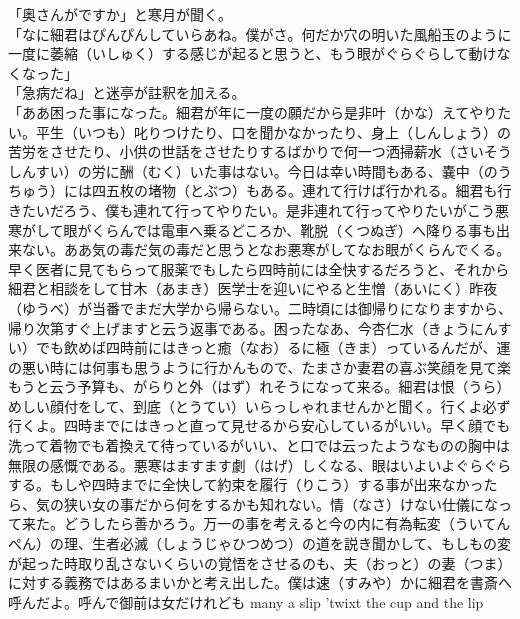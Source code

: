 \documentclass{book}
\begin{document}
「奥さんがですか」と寒月が聞く。\\
「なに細君はぴんぴんしていらあね。僕がさ。何だか穴の明いた風船玉のように一度に萎縮（いしゅく）する感じが起ると思うと、もう眼がぐらぐらして動けなくなった」\\
「急病だね」と迷亭が註釈を加える。\\
「ああ困った事になった。細君が年に一度の願だから是非叶（かな）えてやりたい。平生（いつも）叱りつけたり、口を聞かなかったり、身上（しんしょう）の苦労をさせたり、小供の世話をさせたりするばかりで何一つ洒掃薪水（さいそうしんすい）の労に酬（むく）いた事はない。今日は幸い時間もある、嚢中（のうちゅう）には四五枚の堵物（とぶつ）もある。連れて行けば行かれる。細君も行きたいだろう、僕も連れて行ってやりたい。是非連れて行ってやりたいがこう悪寒がして眼がくらんでは電車へ乗るどころか、靴脱（くつぬぎ）へ降りる事も出来ない。ああ気の毒だ気の毒だと思うとなお悪寒がしてなお眼がくらんでくる。早く医者に見てもらって服薬でもしたら四時前には全快するだろうと、それから細君と相談をして甘木（あまき）医学士を迎いにやると生憎（あいにく）昨夜（ゆうべ）が当番でまだ大学から帰らない。二時頃には御帰りになりますから、帰り次第すぐ上げますと云う返事である。困ったなあ、今杏仁水（きょうにんすい）でも飲めば四時前にはきっと癒（なお）るに極（きま）っているんだが、運の悪い時には何事も思うように行かんもので、たまさか妻君の喜ぶ笑顔を見て楽もうと云う予算も、がらりと外（はず）れそうになって来る。細君は恨（うら）めしい顔付をして、到底（とうてい）いらっしゃれませんかと聞く。行くよ必ず行くよ。四時までにはきっと直って見せるから安心しているがいい。早く顔でも洗って着物でも着換えて待っているがいい、と口では云ったようなものの胸中は無限の感慨である。悪寒はますます劇（はげ）しくなる、眼はいよいよぐらぐらする。もしや四時までに全快して約束を履行（りこう）する事が出来なかったら、気の狭い女の事だから何をするかも知れない。情（なさ）けない仕儀になって来た。どうしたら善かろう。万一の事を考えると今の内に有為転変（ういてんぺん）の理、生者必滅（しょうじゃひつめつ）の道を説き聞かして、もしもの変が起った時取り乱さないくらいの覚悟をさせるのも、夫（おっと）の妻（つま）に対する義務ではあるまいかと考え出した。僕は速（すみや）かに細君を書斎へ呼んだよ。呼んで御前は女だけれども
many a slip 'twixt the cup and the lip
\end{document}
